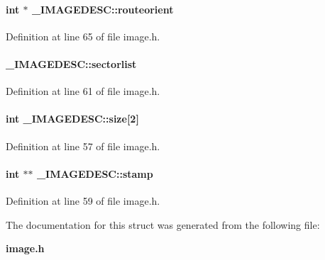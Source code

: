 \paragraph{\setlength{\rightskip}{0pt plus 5cm}int $\ast$ \_\-IMAGEDESC::routeorient}\hfill



Definition at line 65 of file image.h.\label{_IMAGEDESC_m4}
\paragraph{ \_\-IMAGEDESC::sectorlist}\hfill



Definition at line 61 of file image.h.\label{_IMAGEDESC_m0}
\paragraph{\setlength{\rightskip}{0pt plus 5cm}int \_\-IMAGEDESC::size[2]}\hfill



Definition at line 57 of file image.h.\label{_IMAGEDESC_m2}
\paragraph{\setlength{\rightskip}{0pt plus 5cm}int $\ast$$\ast$ \_\-IMAGEDESC::stamp}\hfill



Definition at line 59 of file image.h.

The documentation for this struct was generated from the following file:\begin{CompactItemize}
\item 
{\bf image.h}\end{CompactItemize}
